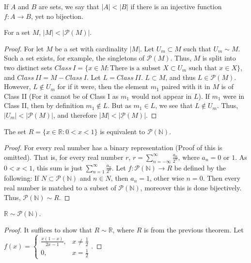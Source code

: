 \documentclass[crop=false,class=article,oneside]{standalone}
\begin{document}
            \begin{definition}
            If $A$ and $B$ are sets, we say that $|A|<|B|$ if there is an injective function $f:A\rightarrow B$, yet no bijection.
            \end{definition}
            \begin{theorem}
            For a set $M$, $|M|<|\mathcal{P}(M)|$.
            \end{theorem}
            \begin{proof}
            For let $M$ be a set with cardinality $|M|$. Let $U_m \subset M$ such that $U_m \sim M$. Such a set exists, for example, the singletons of $\mathcal{P}(M)$. Thus, $M$ is split into two distinct sets $Class\ I=\{x\in M: \textrm{There is a subset } X\subset U_m\textrm{ such that }x\in X\}$, and $Class\ II=M-Class\ I$. Let $L = Class\ II$. $L\subset M$, and thus $L\in \mathcal{P}(M)$. However, $L \notin U_m$ for if it were, then the element $m_1$ paired with it in $M$ is of Class II (For it cannot be of Class I as $m_1$ would not appear in $L$). If $m_1$ were in Class II, then by definition $m_1 \notin L$. But as $m_1 \in L$, we see that $L\notin U_m$. Thus, $|U_m| <|\mathcal{P}(M)|$, and therefore $|M|<|\mathcal{P}(M)|$.
            \end{proof}
            \begin{theorem}
            The set $R=\{x\in \mathbb{R}:0<x<1\}$ is equivalent to $\mathcal{P}(\mathbb{N})$.
            \end{theorem}
            \begin{proof}
            For every real number has a binary representation (Proof of this is omitted). That is, for every real number $r$, $ r = \sum_{n=-\infty}^{\infty} \frac{a_n}{2^n}$, where $a_n = 0$ or $1$. As $0<x<1$, this sum is just $\sum_{n=1}^{\infty} \frac{a_n}{2^n}$. Let $f:\mathcal{P}(\mathbb{N})\rightarrow R$ be defined by the following: If $N\subset \mathcal{P}(\mathbb{N})$ and $n\in N$, then $a_n = 1$, other wise $n=0$. Then every real number is matched to a subset of $\mathcal{P}(\mathbb{N})$, moreover this is done bijectively. Thus, $\mathcal{P}(\mathbb{N})\sim R$.
            \end{proof}
            \begin{theorem}
            $\mathbb{R} \sim \mathcal{P}(\mathbb{N})$.
            \end{theorem}
            \begin{proof}
            It suffices to show that $R\sim \mathbb{R}$, where $R$ is from the previous theorem. Let $f(x) = \begin{cases} \frac{x(1-x)}{2x-1}, & x \ne \frac{1}{2} \\ 0, & x = \frac{1}{2}\end{cases}$.
            \end{proof}
\end{document}

